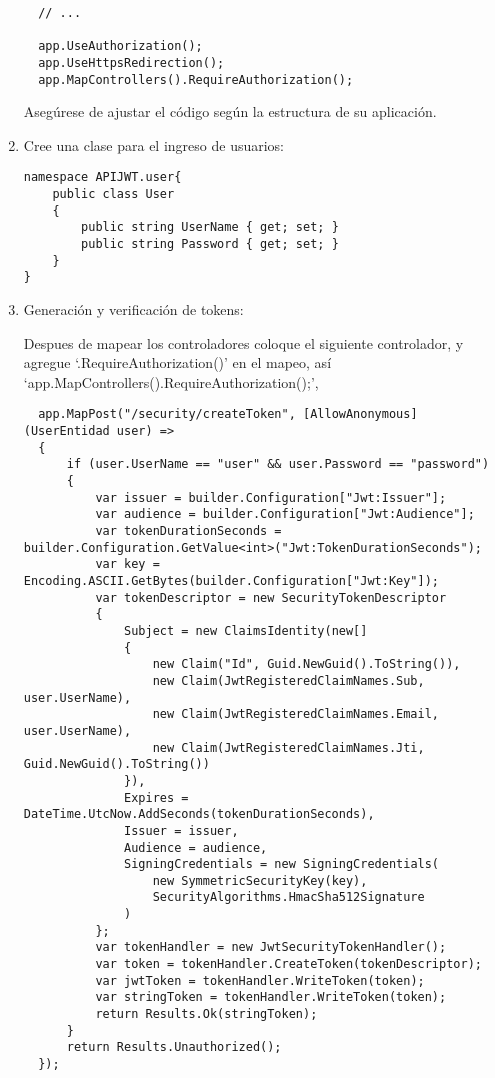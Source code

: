 \documentclass[executivepaper]{article}
\begin{document}
\begin{enumerate}
\begin{lstlisting}
  // ...

  app.UseAuthorization();
  app.UseHttpsRedirection();
  app.MapControllers().RequireAuthorization();
\end{lstlisting}

  Asegúrese de ajustar el código según la estructura de su aplicación.

  \item Cree una clase para el ingreso de usuarios:
 \begin{lstlisting}
namespace APIJWT.user{
    public class User
    {
        public string UserName { get; set; }
        public string Password { get; set; }
    }
}
\end{lstlisting}
  \item Generación y verificación de tokens:
  
  Despues de mapear los controladores coloque el siguiente controlador, y agregue \enquote*{.RequireAuthorization()} en el mapeo, así \enquote*{app.MapControllers().RequireAuthorization();}, 

 \begin{lstlisting}
  app.MapPost("/security/createToken", [AllowAnonymous] (UserEntidad user) =>
  {
      if (user.UserName == "user" && user.Password == "password")
      {
          var issuer = builder.Configuration["Jwt:Issuer"];
          var audience = builder.Configuration["Jwt:Audience"];
          var tokenDurationSeconds = builder.Configuration.GetValue<int>("Jwt:TokenDurationSeconds");
          var key = Encoding.ASCII.GetBytes(builder.Configuration["Jwt:Key"]);
          var tokenDescriptor = new SecurityTokenDescriptor
          {
              Subject = new ClaimsIdentity(new[]
              {
                  new Claim("Id", Guid.NewGuid().ToString()),
                  new Claim(JwtRegisteredClaimNames.Sub, user.UserName),
                  new Claim(JwtRegisteredClaimNames.Email, user.UserName),
                  new Claim(JwtRegisteredClaimNames.Jti, Guid.NewGuid().ToString())
              }),
              Expires = DateTime.UtcNow.AddSeconds(tokenDurationSeconds),
              Issuer = issuer,
              Audience = audience,
              SigningCredentials = new SigningCredentials(
                  new SymmetricSecurityKey(key),
                  SecurityAlgorithms.HmacSha512Signature
              )
          };
          var tokenHandler = new JwtSecurityTokenHandler();
          var token = tokenHandler.CreateToken(tokenDescriptor);
          var jwtToken = tokenHandler.WriteToken(token);
          var stringToken = tokenHandler.WriteToken(token);
          return Results.Ok(stringToken);
      }
      return Results.Unauthorized();
  });
\end{lstlisting}


\end{enumerate}
\end{document}
